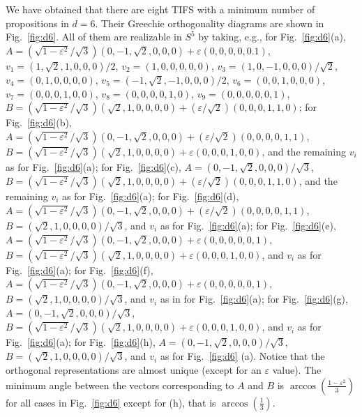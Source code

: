 \documentclass[%
 twocolumn,
 groupedaddress,
 showpacs,
 showkeys,
 preprintnumbers,
 amsmath,amssymb,
 aps,
 pra,
 longbibliography,
 floatfix,
 ]{revtex4-1}
\begin{document}
We have obtained that there are eight TIFS with a minimum number of propositions in $d=6$. Their Greechie orthogonality diagrams are shown in Fig.~\ref{fig:d6}. All of them are realizable in $S^5$ by taking,
e.g., for Fig.~\ref{fig:d6}(a),
$A = (\sqrt{1-\varepsilon^2} / \sqrt{3})({0,-1,\sqrt{2},0,0,0} )+\varepsilon({0,0,0,0,0.1})$,
$v_1 = ({1,\sqrt{2},1,0,0,0} )/ 2 $,
$v_2 = ({1,0,0,0,0,0} )$,
$v_3 = ({1,0,-1,0,0,0} )/\sqrt{2}$,
$v_4 = ({0,1,0,0,0,0} ) $,
$v_5 = ({-1,\sqrt{2},-1,0,0,0} )/ 2$,
$v_6 = ({0,0,1,0,0,0} ) $,
$v_7 = ({0,0,0,1,0,0} )$,
$v_{8} = ({0,0,0,0,1,0} )$,
$v_{9} = ({0,0,0,0,0,1} )$,
$B = (\sqrt{1-\varepsilon^2} / \sqrt{3}) ({\sqrt{2},1,0,0,0,0})+(\varepsilon/\sqrt{2})({0,0,0,1,1,0})$;
for Fig.~\ref{fig:d6}(b),
$A = (\sqrt{1-\varepsilon^2} / \sqrt{3}) ({0,-1,\sqrt{2},0,0,0})+(\varepsilon/\sqrt{2})({0,0,0,0,1,1})$,
$B = (\sqrt{1-\varepsilon^2} / \sqrt{3}) ({\sqrt{2},1,0,0,0,0})+\varepsilon({0,0,0,1,0,0})$,
		and the remaining $v_i$ as for Fig.~\ref{fig:d6}(a);
for Fig.~\ref{fig:d6}(c),
$A = ({0,-1,\sqrt{2},0,0,0})/ \sqrt{3}$,
$B = (\sqrt{1-\varepsilon^2} / \sqrt{3}) ({\sqrt{2},1,0,0,0,0})+(\varepsilon/\sqrt{2})({0,0,0,1,1,0})$,
		and the remaining $v_i$ as for Fig.~\ref{fig:d6}(a);
for Fig.~\ref{fig:d6}(d),
$A = (\sqrt{1-\varepsilon^2} / \sqrt{3}) ({0,-1,\sqrt{2},0,0,0})+(\varepsilon/\sqrt{2})({0,0,0,0,1,1})$,
$B = ({\sqrt{2},1,0,0,0,0})/ \sqrt{3}$,
		and $v_i$ as for Fig.~\ref{fig:d6}(a);
for Fig.~\ref{fig:d6}(e),
$A = (\sqrt{1-\varepsilon^2} / \sqrt{3}) ({0,-1,\sqrt{2},0,0,0})+\varepsilon({0,0,0,0,0,1})$,
$B = (\sqrt{1-\varepsilon^2} / \sqrt{3}) ({\sqrt{2},1,0,0,0,0})+\varepsilon({0,0,0,1,0,0})$,
		and $v_i$ as for Fig.~\ref{fig:d6}(a);
for Fig.~\ref{fig:d6}(f),
$A = (\sqrt{1-\varepsilon^2} / \sqrt{3}) ({0,-1,\sqrt{2},0,0,0})+\varepsilon({0,0,0,0,0,1})$,
$B = ({\sqrt{2},1,0,0,0,0})/ \sqrt{3}$,
		and $v_i$ as in for Fig.~\ref{fig:d6}(a);
for Fig.~\ref{fig:d6}(g),
$A = ({0,-1,\sqrt{2},0,0,0})/ \sqrt{3}$,
$B = (\sqrt{1-\varepsilon^2} / \sqrt{3}) ({\sqrt{2},1,0,0,0,0})+\varepsilon({0,0,0,1,0,0})$,
		and $v_i$ as for Fig.~\ref{fig:d6}(a);
for Fig.~\ref{fig:d6}(h),
$A = ({0,-1,\sqrt{2},0,0,0})/ \sqrt{3}$,
$B = ({\sqrt{2},1,0,0,0,0})/ \sqrt{3}$,
		and $v_i$ as for Fig.~\ref{fig:d6} (a).
		Notice that the orthogonal representations are almost unique (except for an $\varepsilon$ value).
The minimum angle between the vectors corresponding to $A$ and $B$ is $\arccos\left(\frac{1-\varepsilon^2}{3}\right)$ for all cases in Fig.~\ref{fig:d6} except for (h), that is $\arccos\left(\frac{1}{3}\right)$.

\end{document}
